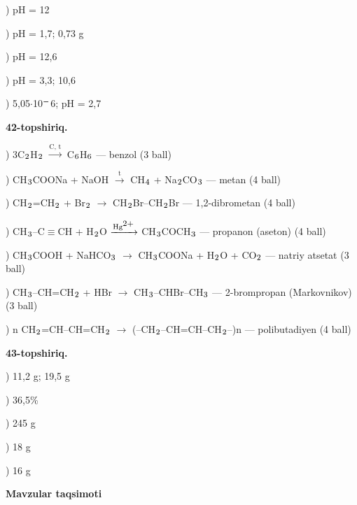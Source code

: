 \documentclass[11pt,a4paper]{article}
\renewcommand{\textsubscript}[1]{\ensuremath{_{\text{\fontsize{8}{8}\selectfont #1}}}}
\renewcommand{\textsuperscript}[1]{\ensuremath{^{\text{\fontsize{8}{8}\selectfont #1}}}}
\begin{document}
) pH = 12\par
{}) pH = 1,7; 0,73 g\par
{}) pH = 12,6\par
{}) pH = 3,3; 10,6\par
{}) 5,05$\cdot$10\textsuperscript{$-$}6; pH = 2,7\par
\noindent\textbf{42-topshiriq.}\par
{}) 3C\textsubscript{2}H\textsubscript{2} $\xrightarrow{\text{C, t}}$ C\textsubscript{6}H\textsubscript{6} --- benzol (3 ball)\par
{}) CH\textsubscript{3}COONa + NaOH $\xrightarrow{\text{t}}$ CH\textsubscript{4} + Na\textsubscript{2}CO\textsubscript{3} --- metan (4 ball)\par
{}) CH\textsubscript{2}=CH\textsubscript{2} + Br\textsubscript{2} $\to$ CH\textsubscript{2}Br--CH\textsubscript{2}Br --- 1,2-dibrometan (4 ball)\par
{}) CH\textsubscript{3}--C$\equiv$CH + H\textsubscript{2}O $\xrightarrow{\text{Hg\textsuperscript{2+}}}$ CH\textsubscript{3}COCH\textsubscript{3} --- propanon (aseton) (4 ball)\par
{}) CH\textsubscript{3}COOH + NaHCO\textsubscript{3} $\to$ CH\textsubscript{3}COONa + H\textsubscript{2}O + CO\textsubscript{2} --- natriy atsetat (3 ball)\par
{}) CH\textsubscript{3}--CH=CH\textsubscript{2} + HBr $\to$ CH\textsubscript{3}--CHBr--CH\textsubscript{3} --- 2-brompropan (Markovnikov) (3 ball)\par
{}) n CH\textsubscript{2}=CH--CH=CH\textsubscript{2} $\to$ (--CH\textsubscript{2}--CH=CH--CH\textsubscript{2}--)n --- polibutadiyen (4 ball)\par
\noindent\textbf{43-topshiriq.}\par
{}) 11,2 g; 19,5 g\par
{}) 36,5\%\par
{}) 245 g\par
{}) 18 g\par
{}) 16 g\par
\par\bigskip\noindent\textbf{Mavzular taqsimoti}\par\smallskip
\end{document}
